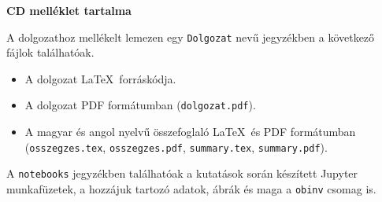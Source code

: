 \pagestyle{empty}

\noindent \textbf{\Large CD melléklet tartalma}

\vskip 1cm

\noindent A dolgozathoz mellékelt lemezen egy \texttt{Dolgozat} nevű jegyzékben a következő fájlok találhatóak.

\begin{itemize}
\item A dolgozat \LaTeX\ forráskódja.
\item A dolgozat PDF formátumban (\texttt{dolgozat.pdf}).
\item A magyar és angol nyelvű összefoglaló \LaTeX\ és PDF formátumban \\ (\texttt{osszegzes.tex}, \texttt{osszegzes.pdf}, \texttt{summary.tex}, \texttt{summary.pdf}).
\end{itemize}


A \texttt{notebooks} jegyzékben találhatóak a kutatások során készített Jupyter munkafüzetek, a hozzájuk tartozó adatok, ábrák és maga a \texttt{obinv} csomag is.
